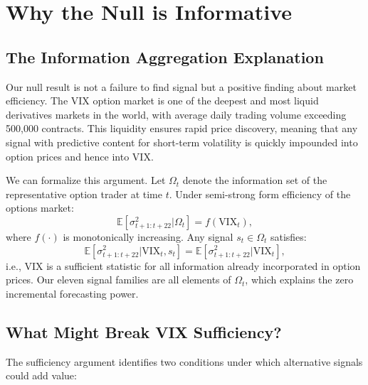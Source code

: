 \documentclass[12pt,a4paper]{article}
\begin{document}
\section{Why the Null is Informative}
\label{sec:null}

\subsection{The Information Aggregation Explanation}

Our null result is not a failure to find signal but a positive finding about market efficiency. The VIX option market is one of the deepest and most liquid derivatives markets in the world, with average daily trading volume exceeding 500,000 contracts. This liquidity ensures rapid price discovery, meaning that any signal with predictive content for short-term volatility is quickly impounded into option prices and hence into VIX.

We can formalize this argument. Let $\Omega_t$ denote the information set of the representative option trader at time $t$. Under semi-strong form efficiency of the options market:
\begin{equation}
\mathbb{E}[\sigma^2_{t+1:t+22} | \Omega_t] = f(\text{VIX}_t),
\label{eq:efficiency}
\end{equation}
where $f(\cdot)$ is monotonically increasing. Any signal $s_t \in \Omega_t$ satisfies:
\begin{equation}
\mathbb{E}[\sigma^2_{t+1:t+22} | \text{VIX}_t, s_t] = \mathbb{E}[\sigma^2_{t+1:t+22} | \text{VIX}_t],
\label{eq:sufficiency}
\end{equation}
i.e., VIX is a sufficient statistic for all information already incorporated in option prices. Our eleven signal families are all elements of $\Omega_t$, which explains the zero incremental forecasting power.

\subsection{What Might Break VIX Sufficiency?}

The sufficiency argument identifies two conditions under which alternative signals could add value:
\end{document}
